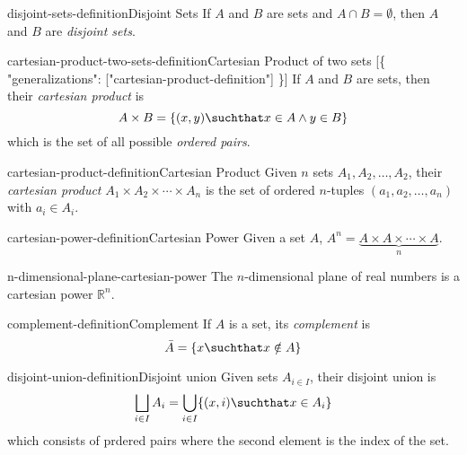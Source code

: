 \documentclass[preview]{standalone}
\begin{document}
\begin{snippetdefinition}{disjoint-sets-definition}{Disjoint Sets}
    If \(A\) and \(B\) are sets and \(A \cap B = \emptyset \), then \(A\)
    and \(B\) are \textit{disjoint sets}.
\end{snippetdefinition}

\begin{snippetdefinition}{cartesian-product-two-sets-definition}{Cartesian Product of two sets}
    [\{
        "generalizations": ["cartesian-product-definition"]
    \}]
    If \(A\) and \(B\) are sets, then their \textit{cartesian product} is
    \[
        A\times B = \{(x,y) \suchthat x \in A \land y \in B\}
    \]
    which is the set of all possible \textit{ordered pairs}.
\end{snippetdefinition}

\begin{snippetdefinition}{cartesian-product-definition}{Cartesian Product}
    Given \(n\) sets \(A_1, A_2, \ldots, A_2\),
    their \textit{cartesian product} \(A_1 \times A_2 \times \cdots \times A_n\)
    is the set of ordered \(n\)-tuples \((a_1, a_2, \ldots, a_n)\) with \(a_i\in A_i\).
\end{snippetdefinition}

\begin{snippetdefinition}{cartesian-power-definition}{Cartesian Power}
    Given a set \(A\), \(A^n=\underbrace{A\times A\times \cdots \times A}_n\).
\end{snippetdefinition}

\begin{snippet}{n-dimensional-plane-cartesian-power}
    The \(n\)-dimensional plane of real numbers is a cartesian power \({\mathbb{R}}^n\).
\end{snippet}

\begin{snippetdefinition}{complement-definition}{Complement}
    If \(A\) is a set, its \textit{complement} is
    \[
        \bar{A} = \{x \suchthat x \notin A\}
    \]
\end{snippetdefinition}

\begin{snippetdefinition}{disjoint-union-definition}{Disjoint union}
    Given sets \(A_{i\in I}\), their disjoint union is
    \[
        \bigsqcup_{i\in I}A_i= \bigcup_{i\in I}\{(x, i) \suchthat x \in A_i\}
    \]
    which consists of prdered pairs where the second element
    is the index of the set.
\end{snippetdefinition}
\end{document}

